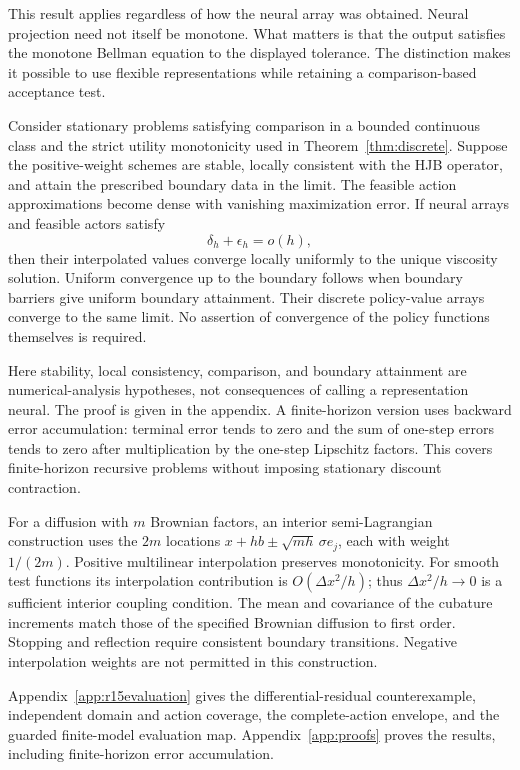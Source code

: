 This result applies regardless of how the neural array was obtained. Neural projection need not itself be monotone. What matters is that the output satisfies the monotone Bellman equation to the displayed tolerance. The distinction makes it possible to use flexible representations while retaining a comparison-based acceptance test.

\begin{theorem}\label{thm:viscosity}
Consider stationary problems satisfying comparison in a bounded continuous class and the strict utility monotonicity used in Theorem~\ref{thm:discrete}. Suppose the positive-weight schemes are stable, locally consistent with the HJB operator, and attain the prescribed boundary data in the limit. The feasible action approximations become dense with vanishing maximization error. If neural arrays and feasible actors satisfy
\begin{equation}\label{eq:scalederror}
 \delta_h+\epsilon_h=o(h),
\end{equation}
then their interpolated values converge locally uniformly to the unique viscosity solution. Uniform convergence up to the boundary follows when boundary barriers give uniform boundary attainment. Their discrete policy-value arrays converge to the same limit. No assertion of convergence of the policy functions themselves is required.
\end{theorem}

Here stability, local consistency, comparison, and boundary attainment are numerical-analysis hypotheses, not consequences of calling a representation neural. The proof is given in the appendix. A finite-horizon version uses backward error accumulation: terminal error tends to zero and the sum of one-step errors tends to zero after multiplication by the one-step Lipschitz factors. This covers finite-horizon recursive problems without imposing stationary discount contraction.

For a diffusion with $m$ Brownian factors, an interior semi-Lagrangian construction uses the $2m$ locations $x+h b\pm\sqrt{mh}\,\sigma e_j$, each with weight $1/(2m)$. Positive multilinear interpolation preserves monotonicity. For smooth test functions its interpolation contribution is $O(\Delta x^2/h)$; thus $\Delta x^2/h\to0$ is a sufficient interior coupling condition. The mean and covariance of the cubature increments match those of the specified Brownian diffusion to first order. Stopping and reflection require consistent boundary transitions. Negative interpolation weights are not permitted in this construction.

Appendix~\ref{app:r15evaluation} gives the differential-residual
counterexample, independent domain and action coverage, the complete-action
envelope, and the guarded finite-model evaluation map. Appendix~\ref{app:proofs}
proves the results, including finite-horizon error accumulation.
